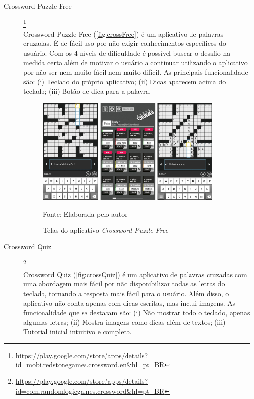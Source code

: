 \begin{description}
\item[Crossword Puzzle Free]\footnote{\url{https://play.google.com/store/apps/details?id=mobi.redstonegames.crossword.en&hl=pt_BR}} \hfill \\
Crossword Puzzle Free (\autoref{fig:crossFree}) é um aplicativo de palavras cruzadas. É de fácil  uso por não exigir conhecimentos específicos do usuário. Com os 4 níveis de dificuldade é possível buscar o desafio na medida certa além de motivar o usuário a continuar utilizando o aplicativo por não ser nem muito fácil nem muito difícil. As principais funcionalidade são: (i) Teclado do próprio aplicativo; (ii) Dicas aparecem acima do teclado; (iii) Botão de dica para a palavra.


\begin{figure}[H]
\centering
    \caption{Telas do aplicativo \textit{Crossword Puzzle Free}}
    \label{fig:crossFree}
    \includegraphics[width=0.9\textwidth]{Figuras/crosswordPuzzleFree.jpg}
    
    Fonte: Elaborada pelo autor
\end{figure}

\item[Crossword Quiz]\footnote{\url{https://play.google.com/store/apps/details?id=com.randomlogicgames.crossword&hl=pt_BR}} \hfill \\
Crossword Quiz (\autoref{fig:crossQuiz}) é um aplicativo de palavras cruzadas com uma abordagem mais fácil por não disponibilizar todas as letras do teclado, tornando a resposta mais fácil para o usuário. Além disso, o aplicativo não conta apenas com dicas escritas, mas inclui imagens. As funcionalidade que se destacam são: (i) Não mostrar todo o teclado, apenas algumas letras; (ii) Mostra imagens como dicas além de textos; (iii) Tutorial inicial intuitivo e completo.


\end{description}
